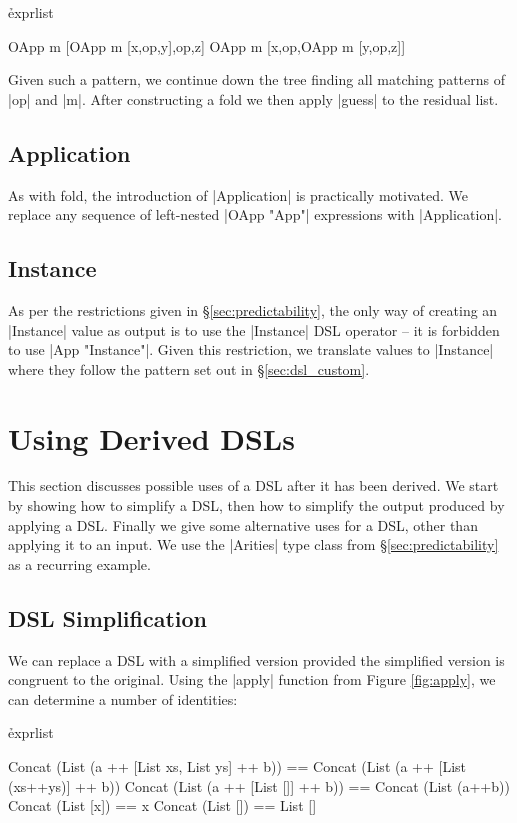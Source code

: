 \documentclass[preprint,draft]{sigplanconf}
\begin{document}
\h{exprlist}\begin{code}
OApp m [OApp m [x,op,y],op,z]
OApp m [x,op,OApp m [y,op,z]]
\end{code}

Given such a pattern, we continue down the tree finding all matching patterns of |op| and |m|. After constructing a fold we then apply |guess| to the residual list.

\subsection{Application}

As with fold, the introduction of |Application| is practically motivated. We replace any sequence of left-nested |OApp "App"| expressions with |Application|.

\subsection{Instance}

As per the restrictions given in \S\ref{sec:predictability}, the only way of creating an |Instance| value as output is to use the |Instance| DSL operator -- it is forbidden to use |App "Instance"|. Given this restriction, we translate values to |Instance| where they follow the pattern set out in \S\ref{sec:dsl_custom}.

\section{Using Derived DSLs}
\label{sec:using}

This section discusses possible uses of a DSL after it has been derived. We start by showing how to simplify a DSL, then how to simplify the output produced by applying a DSL. Finally we give some alternative uses for a DSL, other than applying it to an input. We use the |Arities| type class from \S\ref{sec:predictability} as a recurring example.

\subsection{DSL Simplification}
\label{sec:dsl_simplify}

We can replace a DSL with a simplified version provided the simplified version is congruent to the original. Using the |apply| function from Figure \ref{fig:apply}, we can determine a number of identities:

\h{exprlist}\begin{code}
Concat (List (a ++ [List xs, List ys] ++ b)) ==
    Concat (List (a ++ [List (xs++ys)] ++ b))
Concat (List (a ++ [List []] ++ b)) == Concat (List (a++b))
Concat (List [x]) == x
Concat (List []) == List []
\end{code}
\end{document}
